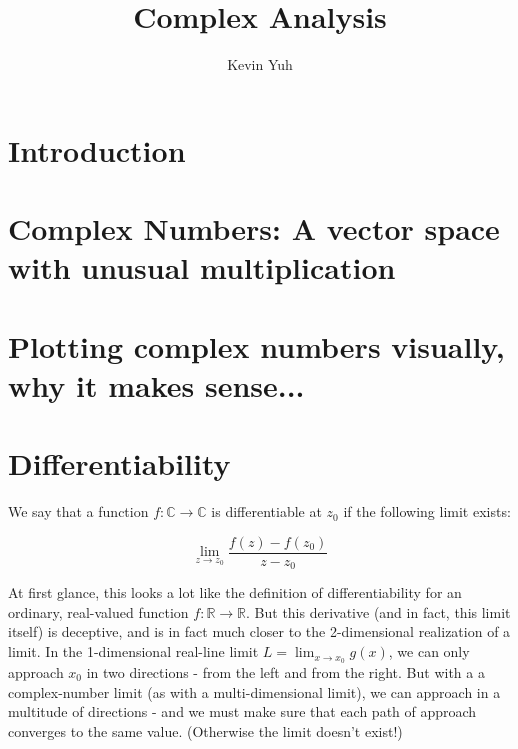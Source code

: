 \documentclass{article}
\title{Complex Analysis}
\author{Kevin Yuh}
\begin{document}
\maketitle

\section{Introduction}


\section{Complex Numbers: A vector space with unusual multiplication}

\section{Plotting complex numbers visually, why it makes sense...}

\section{Differentiability}


We say that a function $f: \mathbb{C} \rightarrow \mathbb{C}$ is differentiable at $z_0$ if the following limit exists:

\begin{equation}
\lim_{z \to z_0}\frac{f(z)-f(z_0)}{z-z_0}
\end{equation}

At first glance, this looks a lot like the definition of differentiability for an ordinary, real-valued function $f: \mathbb{R} \rightarrow \mathbb{R}$. But this derivative (and in fact, this limit itself) is deceptive, and is in fact much closer to the 2-dimensional realization of a limit. In the 1-dimensional real-line limit $L = \lim_{x \to x_0}g(x)$, we can only approach $x_0$ in two directions - from the left and from the right. But with a a complex-number limit (as with a multi-dimensional limit), we can approach in a multitude of directions - and we must make sure that each path of approach converges to the same value. (Otherwise the limit doesn't exist!)
\end{document}
